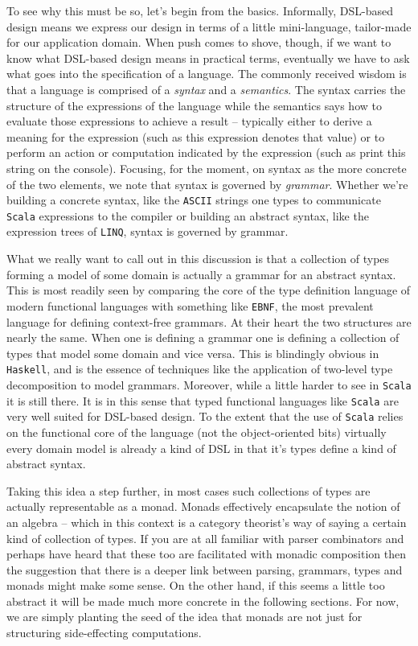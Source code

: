 To see why this must be so, let's begin from the basics. Informally,
DSL-based design means we express our design in terms of a little
mini-language, tailor-made for our application domain. When push
comes to shove, though, if we want to know what DSL-based design means
in practical terms, eventually we have to ask what goes into the
specification of a language. The commonly received wisdom is that a
language is comprised of a \emph{syntax} and a \emph{semantics}. The
syntax carries the structure of the expressions of the language while
the semantics says how to evaluate those expressions to achieve a
result -- typically either to derive a meaning for the expression
(such as this expression denotes that value) or to perform an action or
computation indicated by the expression (such as print this string on
the console). Focusing, for the moment, on syntax as the more concrete
of the two elements, we note that syntax is governed by
\emph{grammar}. Whether we're building a concrete syntax, like the
\texttt{ASCII} strings one types to communicate \texttt{Scala}
expressions to the compiler or building an abstract syntax, like the
expression trees of \texttt{LINQ}, syntax is governed by grammar.

What we really want to call out in this discussion is that a
collection of types forming a model of some domain is actually a
grammar for an abstract syntax. This is most readily seen by comparing
the core of the type definition language of modern functional
languages with something like \texttt{EBNF}, the most prevalent
language for defining context-free grammars. At their heart the two
structures are nearly the same. When one is defining a grammar one is
defining a collection of types that model some domain and vice
versa. This is blindingly obvious in \texttt{Haskell}, and is the
essence of techniques like the application of two-level type
decomposition to model grammars. Moreover, while a little harder to
see in \texttt{Scala} it is still there. It is in this sense that
typed functional languages like \texttt{Scala} are very well suited
for DSL-based design. To the extent that the use of \texttt{Scala}
relies on the functional core of the language (not the object-oriented
bits) virtually every domain model is already a kind of DSL in that
it's types define a kind of abstract syntax.

Taking this idea a step further, in most cases such collections of
types are actually representable as a monad. Monads effectively
encapsulate the notion of an algebra -- which in this context is a
category theorist's way of saying a certain kind of collection of
types. If you are at all familiar with parser combinators and perhaps
have heard that these too are facilitated with monadic composition
then the suggestion that there is a deeper link between parsing,
grammars, types and monads might make some sense. On the other hand,
if this seems a little too abstract it will be made much more concrete
in the following sections. For now, we are simply planting the seed of
the idea that monads are not just for structuring side-effecting
computations.
